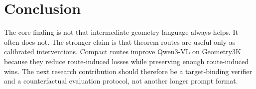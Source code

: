 \documentclass[11pt]{article}
\begin{document}
\section{Conclusion}
The core finding is not that intermediate geometry language always helps. It often does not. The stronger claim is that theorem routes are useful only as calibrated interventions. Compact routes improve Qwen3-VL on Geometry3K because they reduce route-induced losses while preserving enough route-induced wins. The next research contribution should therefore be a target-binding verifier and a counterfactual evaluation protocol, not another longer prompt format.
\end{document}
